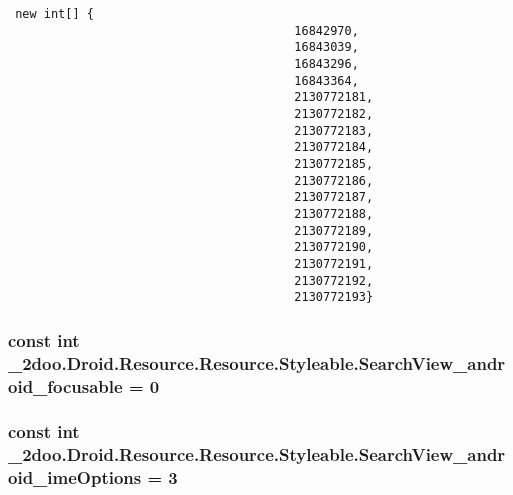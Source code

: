 \begin{Code}\begin{verbatim} new int[] {
                                        16842970,
                                        16843039,
                                        16843296,
                                        16843364,
                                        2130772181,
                                        2130772182,
                                        2130772183,
                                        2130772184,
                                        2130772185,
                                        2130772186,
                                        2130772187,
                                        2130772188,
                                        2130772189,
                                        2130772190,
                                        2130772191,
                                        2130772192,
                                        2130772193}
\end{verbatim}
\end{Code}
\hypertarget{class__2doo_1_1_droid_1_1_resource_1_1_styleable_ad82578148e9f3d9db733a529f258051}{
\subsubsection[{SearchView\_\-android\_\-focusable}]{\setlength{\rightskip}{0pt plus 5cm}const int \_\-2doo.Droid.Resource.Resource.Styleable.SearchView\_\-android\_\-focusable = 0}}
\label{class__2doo_1_1_droid_1_1_resource_1_1_styleable_ad82578148e9f3d9db733a529f258051}


\hypertarget{class__2doo_1_1_droid_1_1_resource_1_1_styleable_e42e1c73748dd445937558d5b44b7cfa}{
\subsubsection[{SearchView\_\-android\_\-imeOptions}]{\setlength{\rightskip}{0pt plus 5cm}const int \_\-2doo.Droid.Resource.Resource.Styleable.SearchView\_\-android\_\-imeOptions = 3}}
\label{class__2doo_1_1_droid_1_1_resource_1_1_styleable_e42e1c73748dd445937558d5b44b7cfa}


